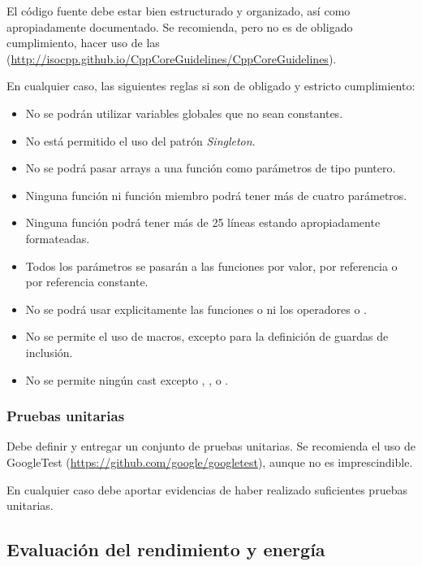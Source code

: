 El código fuente debe estar bien estructurado y organizado, así como
apropiadamente documentado. Se recomienda, pero no es de obligado
cumplimiento, hacer uso de las 
(\url{http://isocpp.github.io/CppCoreGuidelines/CppCoreGuidelines}).

En cualquier caso, las siguientes reglas si son de obligado y
estricto cumplimiento:

\begin{itemize}
  \item No se podrán utilizar variables globales que no sean constantes.
  \item No está permitido el uso del patrón \emph{Singleton}.
  \item No se podrá pasar arrays a una función como parámetros de tipo
        puntero.
  \item Ninguna función ni función miembro podrá tener más de cuatro parámetros.
  \item Ninguna función podrá tener más de 25 líneas estando apropiadamente
        formateadas.
  \item Todos los parámetros se pasarán a las funciones
        por valor, por referencia o por referencia constante.
  \item No se podrá usar explicitamente las funciones  o
         ni los operadores  o .
  \item No se permite el uso de macros, excepto para la definición de
        guardas de inclusión.
  \item No se permite ningún cast excepto ,
        ,  o .
\end{itemize}


\subsubsection{Pruebas unitarias}

Debe definir y entregar un conjunto de pruebas unitarias.
Se recomienda el uso de GoogleTest (\url{https://github.com/google/googletest}),
aunque no es imprescindible.

En cualquier caso debe aportar evidencias de haber realizado suficientes
pruebas unitarias.


\subsection{Evaluación del rendimiento y energía}

